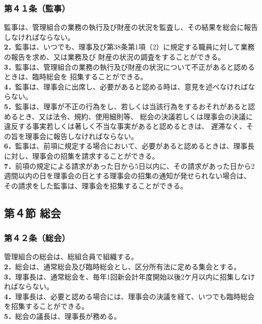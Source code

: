 \documentclass[
  luatex,
  paper=a4paper,
  fontsize=11pt,
  jafontsize=10pt,
  jlreq_notes,
]{jlreq}
\begin{document}
  \subsubsection*{第４１条（監事）}
  監事は、管理組合の業務の執行及び財産の状況を監査し、その結果を総会に報告しなければならない。\\
  \textbf{2．}監事は、いつでも、理事及び第38条第1項（2）に規定する職員に対して業務の報告を求め、又は業務及び
  財産の状況の調査をすることができる。\\
  \textbf{3．}監事は、管理組合の業務の執行及び財産の状況について不正があると認めるときは、臨時総会を
  招集することができる。\\
  \textbf{4．}監事は、理事会に出席し、必要があると認める時は、意見を述べなければならない。\\
  \textbf{5．}監事は、理事が不正の行為をし、若しくは当該行為をするおそれがあると認めるとき、又は法令、規約、使用細則等、
  総会の決議若しくは理事会の決議に違反する事実若しくは著しく不当な事実があると認めるときは、 遅滞なく、その旨を理事会に報告しなければならない。\\
  \textbf{6．}監事は、前項に規定する場合において、必要があると認めるときは、理事長に対し、理事会の招集を請求することができる。\\
  \textbf{7．}前項の規定による請求があった日から5日以内に、その請求があった日から2週間以内の日を理事会の日とする理事会の招集の通知が発せられない場合は、
  その請求をした監事は、理事会を招集することができる。
  \begin{center}
  \subsection*{第４節 総会}
  \end{center}
  \subsubsection*{第４２条（総会）}
  管理組合の総会は、総組合員で組織する。\\
  \textbf{2．}総会は、通常総会及び臨時総会とし、区分所有法に定める集会とする。\\
  \textbf{3．}理事長は、通常総会を、毎年1回新会計年度開始以後2ケ月以内に招集しなければならない。\\
  \textbf{4．}理事長は、必要と認める場合には、理事会の決議を経て、いつでも臨時総会を招集することができる。\\
  \textbf{5．}総会の議長は、理事長が務める。
  
\end{document}
